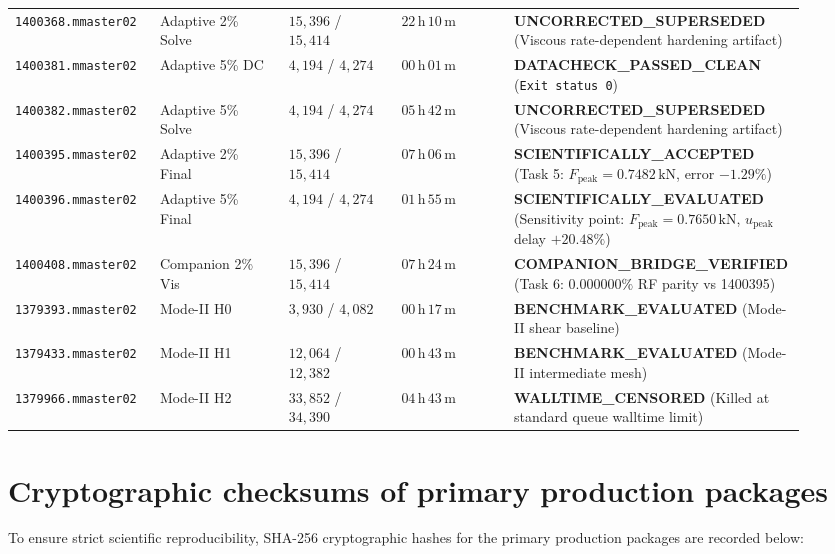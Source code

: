 \begin{table}[htbp]
\begin{tabularx}{\linewidth}{p{0.18\linewidth}p{0.16\linewidth}p{0.14\linewidth}p{0.14\linewidth}p{0.30\linewidth}}
\texttt{1400368.mmaster02} & Adaptive 2\% Solve & $15{,}396$ / $15{,}414$ & $22\,\mathrm{h}\,10\,\mathrm{m}$ & \textbf{UNCORRECTED\_SUPERSEDED} (Viscous rate-dependent hardening artifact) \\
\texttt{1400381.mmaster02} & Adaptive 5\% DC & $4{,}194$ / $4{,}274$ & $00\,\mathrm{h}\,01\,\mathrm{m}$ & \textbf{DATACHECK\_PASSED\_CLEAN} (\texttt{Exit status 0}) \\
\texttt{1400382.mmaster02} & Adaptive 5\% Solve & $4{,}194$ / $4{,}274$ & $05\,\mathrm{h}\,42\,\mathrm{m}$ & \textbf{UNCORRECTED\_SUPERSEDED} (Viscous rate-dependent hardening artifact) \\
\texttt{1400395.mmaster02} & Adaptive 2\% Final & $15{,}396$ / $15{,}414$ & $07\,\mathrm{h}\,06\,\mathrm{m}$ & \textbf{SCIENTIFICALLY\_ACCEPTED} (Task 5: $F_{\text{peak}} = 0.7482\,\mathrm{kN}$, error $-1.29\%$) \\
\texttt{1400396.mmaster02} & Adaptive 5\% Final & $4{,}194$ / $4{,}274$ & $01\,\mathrm{h}\,55\,\mathrm{m}$ & \textbf{SCIENTIFICALLY\_EVALUATED} (Sensitivity point: $F_{\text{peak}} = 0.7650\,\mathrm{kN}$, $u_{\text{peak}}$ delay $+20.48\%$) \\
\texttt{1400408.mmaster02} & Companion 2\% Vis & $15{,}396$ / $15{,}414$ & $07\,\mathrm{h}\,24\,\mathrm{m}$ & \textbf{COMPANION\_BRIDGE\_VERIFIED} (Task 6: $0.000000\%$ RF parity vs 1400395) \\
\texttt{1379393.mmaster02} & Mode-II H0 & $3{,}930$ / $4{,}082$ & $00\,\mathrm{h}\,17\,\mathrm{m}$ & \textbf{BENCHMARK\_EVALUATED} (Mode-II shear baseline) \\
\texttt{1379433.mmaster02} & Mode-II H1 & $12{,}064$ / $12{,}382$ & $00\,\mathrm{h}\,43\,\mathrm{m}$ & \textbf{BENCHMARK\_EVALUATED} (Mode-II intermediate mesh) \\
\texttt{1379966.mmaster02} & Mode-II H2 & $33{,}852$ / $34{,}390$ & $04\,\mathrm{h}\,43\,\mathrm{m}$ & \textbf{WALLTIME\_CENSORED} (Killed at standard queue walltime limit) \\
\bottomrule
\end{tabularx}
\end{table}

\section{Cryptographic checksums of primary production packages}
To ensure strict scientific reproducibility, SHA-256 cryptographic hashes for the primary production packages are recorded below:

